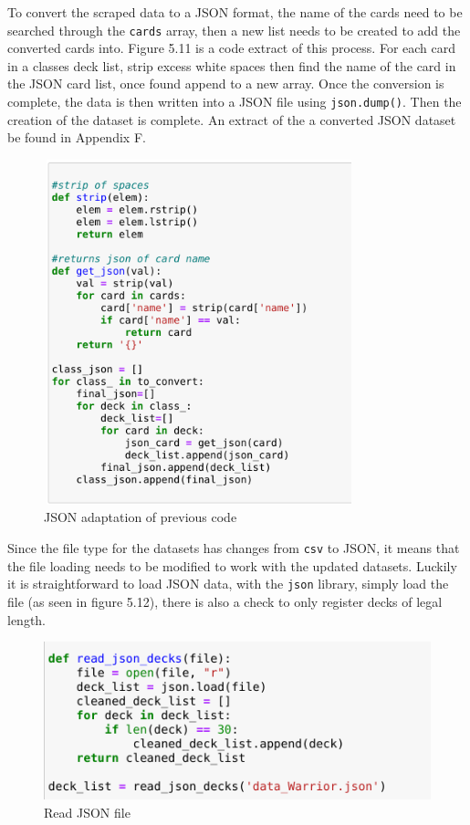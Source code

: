 \documentclass{report} %
\begin{document}
To convert the scraped data to a JSON format, the name of the cards need to be searched through the \texttt{cards} array, then a new list needs to be created to add the converted cards into. Figure 5.11 is a code extract of this process. For each card in a classes deck list, strip excess white spaces then find the name of the card in the JSON card list, once found append to a new array. Once the conversion is complete, the data is then written into a JSON file using \texttt{json.dump()}. Then the creation of the dataset is complete. An extract of the a converted JSON dataset be found in Appendix F.

\begin{figure}[H]
\centering
\includegraphics[width=9cm, height=10cm]{JSONConversion}
\caption{JSON adaptation of previous code\protect}
 \label{board}
\end{figure}

Since the file type for the datasets has changes from \texttt{csv} to JSON, it means that the file loading needs to be modified to work with the updated datasets. Luckily it is straightforward to load JSON data, with the \texttt{json} library, simply load the file (as seen in figure 5.12), there is also a check to only register decks of legal length.

\begin{figure}[H]
\centering
\includegraphics[width=1\textwidth]{readJSONDecks}
\caption{Read JSON file\protect}
 \label{board}
\end{figure}
\end{document}

